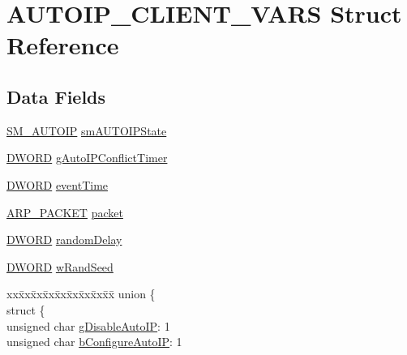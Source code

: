 \hypertarget{struct_a_u_t_o_i_p___c_l_i_e_n_t___v_a_r_s}{}\section{A\+U\+T\+O\+I\+P\+\_\+\+C\+L\+I\+E\+N\+T\+\_\+\+V\+A\+R\+S Struct Reference}
\label{struct_a_u_t_o_i_p___c_l_i_e_n_t___v_a_r_s}
\subsection*{Data Fields}
\begin{DoxyCompactItemize}
\item 
\hyperlink{_auto_i_p_8h_a5f8c15285c3f80fe625bba4dba1da105}{S\+M\+\_\+\+A\+U\+T\+O\+I\+P} \hyperlink{struct_a_u_t_o_i_p___c_l_i_e_n_t___v_a_r_s_afc5c2521bc6a87a1c7f5bb988a3af45a}{sm\+A\+U\+T\+O\+I\+P\+State}
\item 
\hyperlink{_generic_type_defs_8h_ad342ac907eb044443153a22f964bf0af}{D\+W\+O\+R\+D} \hyperlink{struct_a_u_t_o_i_p___c_l_i_e_n_t___v_a_r_s_a029694db546674f2e409c59d9e277dbc}{g\+Auto\+I\+P\+Conflict\+Timer}
\item 
\hyperlink{_generic_type_defs_8h_ad342ac907eb044443153a22f964bf0af}{D\+W\+O\+R\+D} \hyperlink{struct_a_u_t_o_i_p___c_l_i_e_n_t___v_a_r_s_a2ec4952d1b77ec5800649853e0d95c65}{event\+Time}
\item 
\hyperlink{_a_r_p_8h_a9b85aa4504d5f450f3a4453703fb9b23}{A\+R\+P\+\_\+\+P\+A\+C\+K\+E\+T} \hyperlink{struct_a_u_t_o_i_p___c_l_i_e_n_t___v_a_r_s_a052047c86bc4b06b102f574fe1f8c5f5}{packet}
\item 
\hyperlink{_generic_type_defs_8h_ad342ac907eb044443153a22f964bf0af}{D\+W\+O\+R\+D} \hyperlink{struct_a_u_t_o_i_p___c_l_i_e_n_t___v_a_r_s_a5c0440ed6f74c5fba7a484b9f203fe9d}{random\+Delay}
\item 
\hyperlink{_generic_type_defs_8h_ad342ac907eb044443153a22f964bf0af}{D\+W\+O\+R\+D} \hyperlink{struct_a_u_t_o_i_p___c_l_i_e_n_t___v_a_r_s_a1e454edeeb08929854e4864a764c8f15}{w\+Rand\+Seed}
\item 
\begin{tabbing}
xx\=xx\=xx\=xx\=xx\=xx\=xx\=xx\=xx\=\kill
union \{\\
\>struct \{\\
\>\>unsigned char \hyperlink{struct_a_u_t_o_i_p___c_l_i_e_n_t___v_a_r_s_a053de221e8980f220c4c5edf23149dfd}{gDisableAutoIP}: 1\\
\>\>unsigned char \hyperlink{struct_a_u_t_o_i_p___c_l_i_e_n_t___v_a_r_s_a4aa6b75c6ff6cf2c2845366b06966e41}{bConfigureAutoIP}: 1\\

\end{tabbing}
\end{DoxyCompactItemize}
